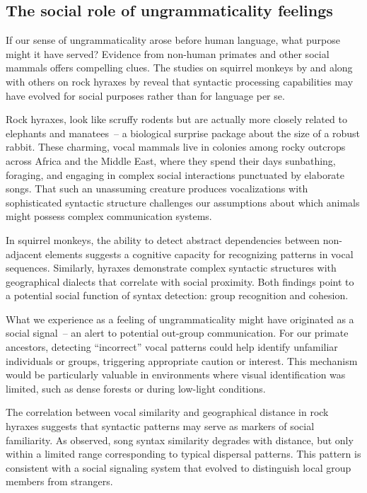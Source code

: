 \subsection{The social role of ungrammaticality feelings}

If our sense of ungrammaticality arose before human language, what purpose might it have served? Evidence from non-human primates and other social mammals offers compelling clues. The studies on squirrel monkeys by \citet{Ravignani2013} and along with others on rock hyraxes by \citet{Kershenbaum2012} reveal that syntactic processing capabilities may have evolved for social purposes rather than for language per se.

Rock hyraxes, look like scruffy rodents but are actually more closely related to elephants and manatees~-- a biological surprise package about the size of a robust rabbit. These charming, vocal mammals live in colonies among rocky outcrops across Africa and the Middle East, where they spend their days sunbathing, foraging, and engaging in complex social interactions punctuated by elaborate songs. That such an unassuming creature produces vocalizations with sophisticated syntactic structure challenges our assumptions about which animals might possess complex communication systems.

In squirrel monkeys, the ability to detect abstract dependencies between non-adjacent elements suggests a cognitive capacity for recognizing patterns in vocal sequences. Similarly, hyraxes demonstrate complex syntactic structures with geographical dialects that correlate with social proximity. Both findings point to a potential social function of syntax detection: group recognition and cohesion.

What we experience as a feeling of ungrammaticality might have originated as a social signal~-- an alert to potential out-group communication. For our primate ancestors, detecting ``incorrect'' vocal patterns could help identify unfamiliar individuals or groups, triggering appropriate caution or interest. This mechanism would be particularly valuable in environments where visual identification was limited, such as dense forests or during low-light conditions.

The correlation between vocal similarity and geographical distance in rock hyraxes suggests that syntactic patterns may serve as markers of social familiarity. As \citet{Kershenbaum2012} observed, song syntax similarity degrades with distance, but only within a limited range corresponding to typical dispersal patterns. This pattern is consistent with a social signaling system that evolved to distinguish local group members from strangers.

